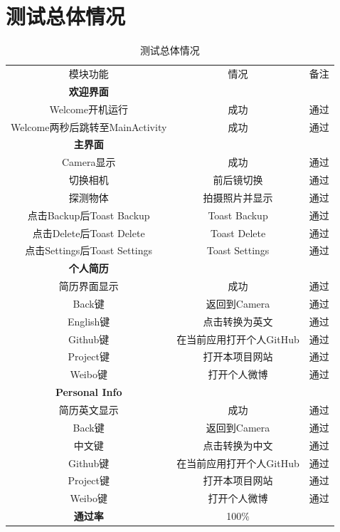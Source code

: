 \documentclass[UTF8, Microsoft YaHei]{book}
\begin{document}
    \section{测试总体情况}
    \begin{table}[!htb]
      \centering
      \begin{tabular}{|c|c|c|}
        \hline
        模块功能 & 情况 & 备注 \\
        \textbf{欢迎界面}\\
        Welcome开机运行 & 成功  & 通过 \\
        Welcome两秒后跳转至MainActivity & 成功 & 通过 \\
        \textbf{主界面}& \\
        Camera显示 & 成功 & 通过 \\
        切换相机 & 前后镜切换 & 通过 \\
        探测物体 & 拍摄照片并显示 & 通过 \\
        点击Backup后Toast Backup & Toast Backup & 通过 \\
        点击Delete后Toast Delete & Toast Delete & 通过 \\
        点击Settings后Toast Settings & Toast Settings & 通过\\
        \textbf{个人简历} & \\
        简历界面显示 & 成功 & 通过\\
        Back键 & 返回到Camera & 通过\\
        English键 & 点击转换为英文 & 通过 \\
        Github键 & 在当前应用打开个人GitHub & 通过 \\
        Project键 & 打开本项目网站 & 通过 \\
        Weibo键 & 打开个人微博 & 通过\\
        \textbf{Personal Info} & \\
        简历英文显示 & 成功 & 通过 \\
        Back键 & 返回到Camera & 通过\\
        中文键 & 点击转换为中文 & 通过\\
        Github键 & 在当前应用打开个人GitHub & 通过 \\
        Project键 & 打开本项目网站 & 通过 \\
        Weibo键 & 打开个人微博 & 通过\\
        \textbf{通过率} & 100\% \\
        \hline
      \end{tabular}
      \caption{测试总体情况}\label{测试总体情况}
    \end{table}
\end{document}
